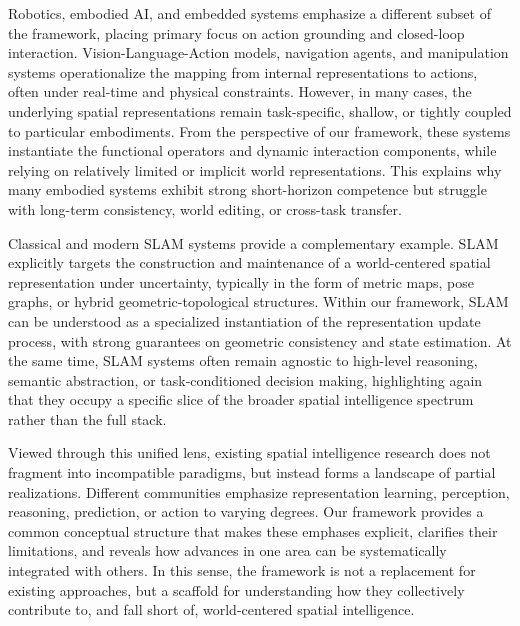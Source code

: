 Robotics, embodied AI, and embedded systems emphasize a different subset of the framework, placing primary focus on action grounding and closed-loop interaction.
Vision-Language-Action models, navigation agents, and manipulation systems operationalize the mapping from internal representations to actions, often under real-time and physical constraints.
However, in many cases, the underlying spatial representations remain task-specific, shallow, or tightly coupled to particular embodiments.
From the perspective of our framework, these systems instantiate the functional operators and dynamic interaction components, while relying on relatively limited or implicit world representations.
This explains why many embodied systems exhibit strong short-horizon competence but struggle with long-term consistency, world editing, or cross-task transfer.



Classical and modern SLAM systems provide a complementary example.
SLAM explicitly targets the construction and maintenance of a world-centered spatial representation under uncertainty, typically in the form of metric maps, pose graphs, or hybrid geometric-topological structures.
Within our framework, SLAM can be understood as a specialized instantiation of the representation update process, with strong guarantees on geometric consistency and state estimation.
At the same time, SLAM systems often remain agnostic to high-level reasoning, semantic abstraction, or task-conditioned decision making, highlighting again that they occupy a specific slice of the broader spatial intelligence spectrum rather than the full stack.




Viewed through this unified lens, existing spatial intelligence research does not fragment into incompatible paradigms, but instead forms a landscape of partial realizations.
Different communities emphasize representation learning, perception, reasoning, prediction, or action to varying degrees.
Our framework provides a common conceptual structure that makes these emphases explicit, clarifies their limitations, and reveals how advances in one area can be systematically integrated with others.
In this sense, the framework is not a replacement for existing approaches, but a scaffold for understanding how they collectively contribute to, and fall short of, world-centered spatial intelligence.


